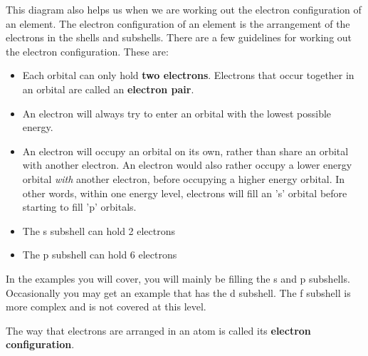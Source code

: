 \label{m38741*eip-752}This diagram also helps us when we are working out the electron configuration of an element. The electron configuration of an element is the arrangement of the electrons in the shells and subshells. There are a few guidelines for working out the electron configuration. These are:
\par \label{m38741*id259303}\begin{itemize}[noitemsep]
            \label{m38741*uid93}\item Each orbital can only hold \textbf{two electrons}. Electrons that occur together in an orbital are called an \textbf{electron pair}.
\label{m38741*uid94}\item An electron will always try to enter an orbital with the lowest possible energy.
\label{m38741*uid95}\item An electron will occupy an orbital on its own, rather than share an orbital with another electron. An electron would also rather occupy a lower energy orbital \textsl{with} another electron, before occupying a higher energy orbital. In other words, within one energy level, electrons will fill an 's' orbital before starting to fill 'p' orbitals.
\label{m38741*uid83}\item The s subshell can hold 2 electrons
\label{m38741*uid84}\item The p subshell can hold 6 electrons
\end{itemize}
        \label{m38741*eip-15}In the examples you will cover, you will mainly be filling the s and p subshells. Occasionally you may get an example that has the d subshell. The f subshell is more complex and is not covered at this level.
\par 
        \label{m38741*id259599}The way that electrons are arranged in an atom is called its \textbf{electron configuration}.\par 

        
